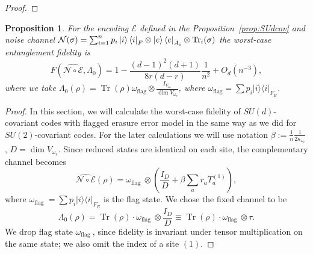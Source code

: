 \documentclass[10pt,twocolumn,superscriptaddress,aps,amsmath,amssymb,citeautoscript,floatfix,prx]{revtex4-2}
\theoremstyle{plain}
\theoremstyle{plain}
\theoremstyle{plain}
\theoremstyle{plain}
\theoremstyle{plain}
\theoremstyle{plain}
\theoremstyle{plain}
\newtheorem{smproposition}[smtheorem]{Proposition}
\theoremstyle{definition}
\theoremstyle{plain}
\begin{document}
\begin{appendix}
\begin{proof}
\end{proof}


\begin{smproposition}\label{prop:SUdcovfidelity}
    For the encoding $\mathcal{E}$ defined in the Proposition~\ref{prop:SUdcov} and noise channel $\mathcal{N}(\sigma)=\sum_{i=1}^n p_i \ket{i}\bra{i}_F \otimes \ket{e}\bra{e}_{A_i} \otimes \operatorname{Tr}_i(\sigma)$ the worst-case entanglement fidelity is
    \[
        F(\widehat{\mathcal{N} \circ \mathcal{E}}, \Lambda_0)=1-\frac{(d-1)^2(d+1)}{8 r(d-r)}\frac{1}{n^2}+O_{d}\left(n^{-3}\right),
    \]
    where we take $\Lambda_0(\rho)=\operatorname{Tr}(\rho)\omega_{\text{flag}}\otimes\frac{I_{V_{\omega_r}}}{\operatorname{dim} V_{\omega_r}}$, where $\omega_{\text {flag}}=\sum p_i|i\rangle\langle i|_{F_E}$.
\end{smproposition}

\begin{proof}
In this section, we will calculate the worst-case fidelity of $SU(d)$-covariant codes with flagged erasure error model
in the same way as we did for $SU(2)$-covariant codes. 
For the later calculations we will use notation $\beta:=\frac{1}{n} \frac{1}{2\kappa_{\omega_r}}$, $D=\operatorname{dim} V_{\omega_r}$.
Since reduced states are identical on each site, the complementary channel becomes
\[
        \widehat{\mathcal{N} \circ \mathcal{E}}(\rho)=\omega_{\text {flag }} \otimes \left(\frac{I_D}{D}+ \beta \sum_a r_a T_a^{(1)}\right),
\]
where $\omega_{\text {flag }}=\sum p_i|i\rangle\langle i|_{F_E}$ is the flag state. We chose the fixed channel to be 
$$
\Lambda_0(\rho)=\operatorname{Tr}(\rho)\cdot \omega_{\text {flag }}\otimes \frac{I_{D}}{D} \equiv \operatorname{Tr}(\rho)\cdot \omega_{\text {flag }}\otimes \tau.
$$ 
We drop flag state $\omega_{\text {flag }}$, since fidelity is invariant under 
tensor multiplication on the same state; we also omit the index of a site $(1)$.


\end{proof}
\end{appendix}
\end{document}
